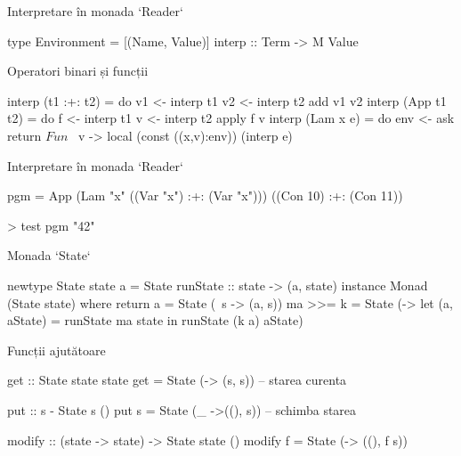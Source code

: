\documentclass[xcolor=pdftex,romanian,colorlinks]{beamer}
\begin{document}
\begin{frame}[fragile]{Interpretare în monada `Reader`}

\begin{asciihs}
type Environment = [(Name, Value)]
interp :: Term ->  M Value
\end{asciihs}
Operatori binari și funcții

\begin{asciihs}
interp (t1 :+: t2) = do
  v1 <- interp t1
  v2 <- interp t2
  add v1 v2
interp (App t1 t2) = do
  f <- interp t1
  v <- interp t2
  apply f v
interp (Lam x e) = do
  env <- ask
  return $ Fun $ \ v -> 
    local (const ((x,v):env)) (interp e) 
\end{asciihs}  
\end{frame}

\begin{frame}[fragile]{Interpretare în monada `Reader`}



\begin{asciihs}
pgm = App 
          (Lam "x" ((Var "x") :+: (Var "x")))
          ((Con 10) :+:  (Con 11))

> test pgm
"42"
\end{asciihs}
\end{frame}

\begin{frame}[fragile]{Monada `State`}


\begin{asciihs}
newtype State state a =
  State { runState :: state -> (a, state) }
instance Monad (State state) where
  return a = State (\ s -> (a, s))
  ma >>= k = State (\state ->
      let (a, aState) = runState ma state
       in runState (k a) aState)
\end{asciihs}


Funcții ajutătoare

\begin{asciihs}
get :: State state state
get = State (\s -> (s, s))  -- starea curenta

put :: s -\> State s ()  
put s = State (\_ ->((), s)) -- schimba starea

modify :: (state -> state) -> State state ()
modify f = State (\s -> ((), f s))
\end{asciihs}
\end{frame}
\end{document}

